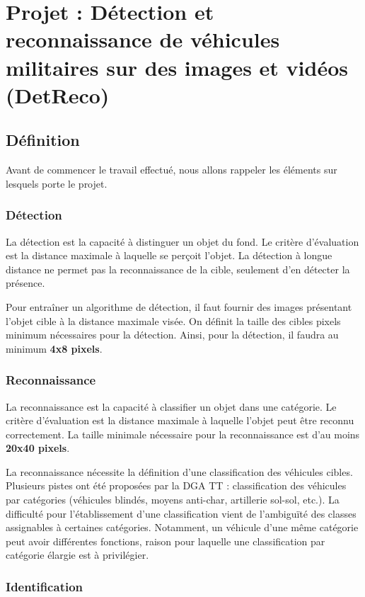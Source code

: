 \chapter{Projet :  Détection et reconnaissance de véhicules militaires sur des images et vidéos (DetReco)}
\label{chap:3}
\sloppy

\section{Définition}

Avant de commencer le travail effectué, nous allons rappeler les éléments sur lesquels porte le projet.
\subsection{Détection}
La détection est la capacité à distinguer un objet du fond. Le critère d'évaluation est la distance maximale à laquelle se perçoit l'objet. La détection à longue distance ne permet pas la reconnaissance de la cible, seulement d'en détecter la présence.

Pour entraîner un algorithme de détection, il faut fournir des images présentant l'objet cible à la distance maximale visée. On définit la taille des cibles pixels minimum nécessaires pour la détection. Ainsi, pour la détection, il faudra au minimum \textbf{4x8 pixels}.


\subsection{Reconnaissance}

La reconnaissance est la capacité à classifier un objet dans une catégorie. Le critère d'évaluation est la distance maximale à laquelle l'objet peut être reconnu correctement. La taille minimale nécessaire pour la reconnaissance est d'au moins \textbf{20x40 pixels}.

La reconnaissance nécessite la définition d'une classification des véhicules cibles. Plusieurs pistes ont été proposées par la DGA TT : classification des véhicules par catégories (véhicules blindés, moyens anti-char, artillerie sol-sol, etc.). La difficulté pour l'établissement d'une classification vient de l'ambiguïté des classes assignables à certaines catégories. Notamment, un véhicule d'une même catégorie peut avoir différentes fonctions, raison pour laquelle une classification par catégorie élargie est à privilégier.


\subsection{Identification}


